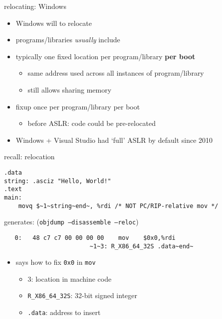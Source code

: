 \begin{frame}{relocating: Windows}
    \begin{itemize}
        \item Windows will  to relocate
        \item programs/libraries \textit{usually} include 
        \item typically one fixed location per program/library \textbf{per boot}
            \begin{itemize}
                \item same address used across all instances of program/library
                \item still allows sharing memory
            \end{itemize}
        \item fixup once per program/library per boot
            \begin{itemize}
                \item before ASLR: code could be pre-relocated
            \end{itemize}
        \item Windows + Visual Studio had `full' ASLR by default since 2010
    \end{itemize}
\end{frame}
\begin{frame}[fragile,label=reloc]{recall: relocation}
\begin{lstlisting}
.data
string: .asciz "Hello, World!"
.text
main:
    movq $~1~string~end~, %rdi /* NOT PC/RIP-relative mov */
\end{lstlisting}
    generates: (\texttt{objdump --disassemble --reloc})
\begin{lstlisting}
   0:   48 c7 c7 00 00 00 00    mov    $0x0,%rdi
                        ~1~3: R_X86_64_32S .data~end~
\end{lstlisting}
    \begin{itemize}
        \item {} says how to fix \texttt{0x0} in \texttt{mov}
            \begin{itemize}
                \item 3: location in machine code
                \item \texttt{R\_X86\_64\_32S}: 32-bit signed integer
                \item \texttt{.data}: address to insert
            \end{itemize}
    \end{itemize}
\end{frame}

